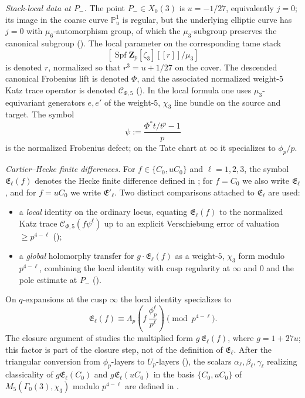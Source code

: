 \documentclass[11pt]{amsart}
\theoremstyle{definition}
\theoremstyle{remark}
\newcommand{\Z}{\mathbf{Z}}
\begin{document}
\emph{Stack-local data at $P_-$.} The point $P_-\in X_0(3)$ is $u=-1/27$, equivalently $j=0$; its image in the coarse curve $\mathbb P^1_u$ is regular, but the underlying elliptic curve has $j=0$ with $\mu_6$-automorphism group, of which the $\mu_3$-subgroup preserves the canonical subgroup (). The local parameter on the corresponding tame stack
\[
[\operatorname{Spf}\Z_p[\zeta_3][[r]]/\mu_3]
\]
is denoted $r$, normalized so that $r^3=u+1/27$ on the cover. The descended canonical Frobenius lift is denoted $\Phi$, and the associated normalized weight-$5$ Katz trace operator is denoted $\mathcal C_{\Phi,5}$ (). In the local formula one uses $\mu_3$-equivariant generators $e,e'$ of the weight-$5$, $\chi_3$ line bundle on the source and target. The symbol
\[
\psi:=\frac{\Phi^*t/t^p-1}{p}
\]
is the normalized Frobenius defect; on the Tate chart at $\infty$ it specializes to $\phi_p/p$.

\emph{Cartier--Hecke finite differences.} For $f\in\{C_0,uC_0\}$ and $\ell=1,2,3$, the symbol $\mathfrak E_\ell(f)$ denotes the Hecke finite difference defined in ; for $f=C_0$ we also write $\mathfrak E_\ell$, and for $f=uC_0$ we write $\mathfrak E'_\ell$. Two distinct comparisons attached to $\mathfrak E_\ell$ are used:
\begin{itemize}[leftmargin=2em]
\item a \emph{local} identity on the ordinary locus, equating $\mathfrak E_\ell(f)$ to the normalized Katz trace $\mathcal C_{\Phi,5}(f\psi^\ell)$ up to an explicit Verschiebung error of valuation $\ge p^{4-\ell}$ ();
\item a \emph{global} holomorphy transfer for $g\cdot\mathfrak E_\ell(f)$ as a weight-$5$, $\chi_3$ form modulo $p^{4-\ell}$, combining the local identity with cusp regularity at $\infty$ and $0$ and the pole estimate at $P_-$ ().
\end{itemize}
On $q$-expansions at the cusp $\infty$ the local identity specializes to
\[
\mathfrak E_\ell(f)\equiv\Lambda_p\!\left(f\,\frac{\phi_p^\ell}{p^\ell}\right)\pmod{p^{4-\ell}}.
\]
The closure argument of  studies the multiplied form $g\,\mathfrak E_\ell(f)$, where $g=1+27u$; this factor is part of the closure step, not of the definition of $\mathfrak E_\ell$. After the triangular conversion from $\phi_p$-layers to $U_p$-layers (), the scalars $\alpha_\ell,\beta_\ell,\gamma_\ell$ realizing classicality of $g\mathfrak E_\ell(C_0)$ and $g\mathfrak E_\ell(uC_0)$ in the basis $\{C_0,uC_0\}$ of $M_5(\Gamma_0(3),\chi_3)$ modulo $p^{4-\ell}$ are defined in .
\end{document}
